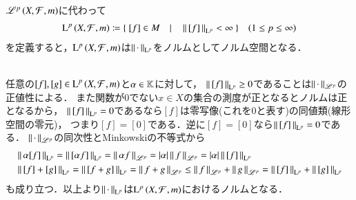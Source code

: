 \begin{qst}
$\mathscr{L}^{p} \left(X,\mathcal{F},m\right)$に代わって
\begin{align}
	\operatorname{L}^{p} \left(X,\mathcal{F},m\right) \coloneqq \{\ [f] \in M \quad |\quad \left\|\, [f]\, \right\|_{\mathrm{L}^p} < \infty\ \} \quad (1 \leq p \leq \infty)
\end{align}
を定義すると，$\operatorname{L}^{p} \left(X,\mathcal{F},m\right)$は$\left\|\, \cdot\, \right\|_{\mathrm{L}^p}$をノルムとしてノルム空間となる．
\begin{bcs}\mbox{}\\
	任意の$[f],[g] \in \operatorname{L}^{p} \left(X,\mathcal{F},m\right)$と$\alpha \in \mathbb{K}$に対して，
	$\left\|\, [f]\, \right\|_{\mathrm{L}^p} \geq 0$であることは$\left\|\, \cdot\, \right\|_{\mathscr{L}^p}$の正値性による．
	また関数が0でない$x \in X$の集合の測度が正となるとノルムは正となるから，
	$\left\|\, [f]\, \right\|_{\mathrm{L}^p} = 0$であるなら$[f]$は零写像(これを0と表す)の同値類(線形空間の零元)，
	つまり$[f] = [0]$である．逆に$[f] = [0]$なら$\left\|\, [f]\, \right\|_{\mathrm{L}^p} = 0$である．
	$\left\|\, \cdot\, \right\|_{\mathscr{L}^p}$の同次性とMinkowskiの不等式から
	\begin{align}
		&\left\|\, \alpha[f]\, \right\|_{\mathrm{L}^p} = \left\|\, [\alpha f]\, \right\|_{\mathrm{L}^p} = \left\|\, \alpha f\, \right\|_{\mathscr{L}^p} = |\alpha|\left\|\, f\, \right\|_{\mathscr{L}^p} = |\alpha|\left\|\, [f]\, \right\|_{\mathrm{L}^p} \\
		&\left\|\, [f] + [g]\, \right\|_{\mathrm{L}^p} = \left\|\, [f + g]\, \right\|_{\mathrm{L}^p} = \left\|\, f + g\, \right\|_{\mathscr{L}^p} \leq \left\|\, f\, \right\|_{\mathscr{L}^p} + \left\|\, g\, \right\|_{\mathscr{L}^p} = \left\|\, [f]\, \right\|_{\mathrm{L}^p} + \left\|\, [g]\, \right\|_{\mathrm{L}^p}
	\end{align}
	も成り立つ．以上より$\left\|\, \cdot\, \right\|_{\mathrm{L}^p}$は$\operatorname{L}^{p} \left(X,\mathcal{F},m\right)$におけるノルムとなる．
	\QED
\end{bcs}


\end{qst}
